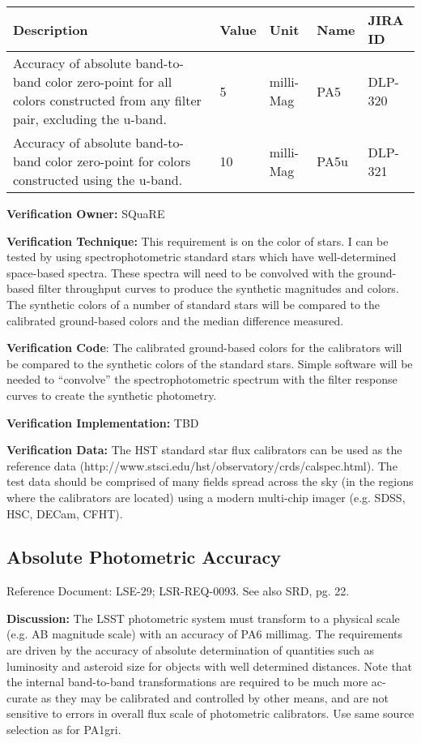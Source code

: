 \documentclass[DM,lsstdraft,toc]{lsstdoc}
\begin{document}
\begin{longtable}[]{@{}p{}llll@{}}
\toprule
Description & Value & Unit & Name & JIRA ID\tabularnewline
\midrule
\endhead
Accuracy of absolute band-to-band color zero-point for all colors
constructed from any filter pair, excluding the u-band. & 5 & milli-Mag
& PA5 & DLP-320\tabularnewline
Accuracy of absolute band-to-band color zero-point for colors
constructed using the u-band. & 10 & milli-Mag & PA5u &
DLP-321\tabularnewline
\bottomrule
\end{longtable}

\textbf{Verification Owner:} SQuaRE

\textbf{Verification Technique:} This requirement is on the color of
stars. I can be tested by using spectrophotometric standard stars which
have well-determined space-based spectra. These spectra will need to be
convolved with the ground-based filter throughput curves to produce the
synthetic magnitudes and colors. The synthetic colors of a number of
standard stars will be compared to the calibrated ground-based colors
and the median difference measured.

\textbf{Verification Code}: The calibrated ground-based colors for the
calibrators will be compared to the synthetic colors of the standard
stars. Simple software will be needed to ``convolve'' the
spectrophotometric spectrum with the filter response curves to create
the synthetic photometry.

\textbf{Verification Implementation:} TBD

\textbf{Verification Data:} The HST standard star flux calibrators can
be used as the reference data
(http://www.stsci.edu/hst/observatory/crds/calspec.html). The test data
should be comprised of many fields spread across the sky (in the regions
where the calibrators are located) using a modern multi-chip imager
(e.g. SDSS, HSC, DECam, CFHT).

\subsection{Absolute Photometric
Accuracy}\label{absolute-photometric-accuracy}

Reference Document: LSE-29; LSR-REQ-0093. See also SRD, pg. 22.

\textbf{Discussion:} The LSST photometric system must transform to a
physical scale (e.g. AB magnitude scale) with an accuracy of PA6
millimag. The requirements are driven by the accuracy of absolute
determination of quantities such as luminosity and asteroid size for
objects with well determined distances. Note that the internal
band-to-band transformations are required to be much more ac- curate as
they may be calibrated and controlled by other means, and are not
sensitive to errors in overall flux scale of photometric calibrators.
Use same source selection as for PA1gri.
\end{document}
